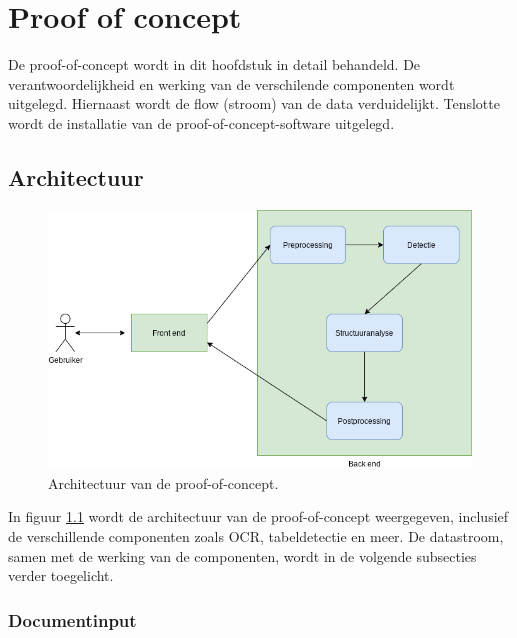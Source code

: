 
\chapter{Proof of concept}
\label{ch:proof-of-concept}

De proof-of-concept wordt in dit hoofdstuk in detail behandeld. De verantwoordelijkheid en werking van de verschilende componenten wordt uitgelegd. Hiernaast wordt de flow (stroom) van de data verduidelijkt. Tenslotte wordt de installatie van de proof-of-concept-software uitgelegd.

\section{Architectuur}
\label{sec:architectuur}

\begin{figure}[H]
    \centering
    \includegraphics[width=1\textwidth]{img/proof_of_concept_architectuur.png}
    \caption{Architectuur van de proof-of-concept.}
    \label{fig:architectuur-proof-of-concept}
\end{figure}

In figuur \ref{fig:architectuur-proof-of-concept} wordt de architectuur van de proof-of-concept weergegeven, inclusief de verschillende componenten zoals \Gls{OCR}, tabeldetectie en meer. De datastroom, samen met de werking van de componenten, wordt in de volgende subsecties verder toegelicht.

\subsection{Documentinput}
\label{subsec:document-input}

